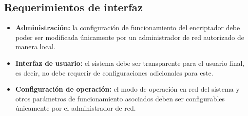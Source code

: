 \documentclass[12pt]{article}
\begin{document}
\subsection{Requerimientos de interfaz}
\begin{itemize}
    \item \textbf{Administración:} la configuración de funcionamiento del  encriptador debe poder ser modificada únicamente por un administrador de red autorizado de manera local.
    \item \textbf{Interfaz de usuario:} el sistema debe ser transparente para el usuario final, es decir, no debe requerir de configuraciones adicionales para este.
    \item \textbf{Configuración de operación:} el modo de operación en red del sistema y otros parámetros de funcionamiento asociados deben ser configurables únicamente por el administrador de red.
\end{itemize}
\end{document}
